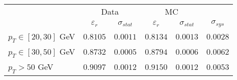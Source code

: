 \begin{tabular}{|l||c|c||c|c||c|}
\hline
&\multicolumn{2}{c||}{Data}&\multicolumn{2}{c||}{MC}&\multicolumn{1}{c|}{}\\ & $\varepsilon_r$ & $\sigma_{stat}$ & $\varepsilon_r$ & $\sigma_{stat}$ & $\sigma_{sys}$\\ 
\hline\hline
$p_{T}\in[20,30]$ GeV &  $0.8105$ &  $0.0011$ &  $0.8134$ &  $0.0013$ &  $0.0028$\\ 
$p_{T}\in[30,50]$ GeV &  $0.8732$ &  $0.0005$ &  $0.8794$ &  $0.0006$ &  $0.0062$\\ 
$p_{T} > 50$ GeV &  $0.9097$ &  $0.0012$ &  $0.9150$ &  $0.0012$ &  $0.0053$\\ 
\hline
\end{tabular}
